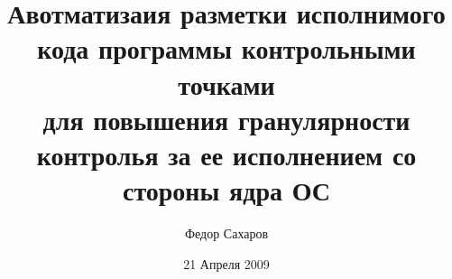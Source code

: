 \begin{titlepage}
	\author{Федор Сахаров}
	\title{Авотматизаия разметки исполнимого кода программы контрольными точками \\
	для повышения гранулярности контролья за ее исполнением со стороны ядра ОС}
	\date{21 Апреля 2009}
	\maketitle
	
\end{titlepage}

